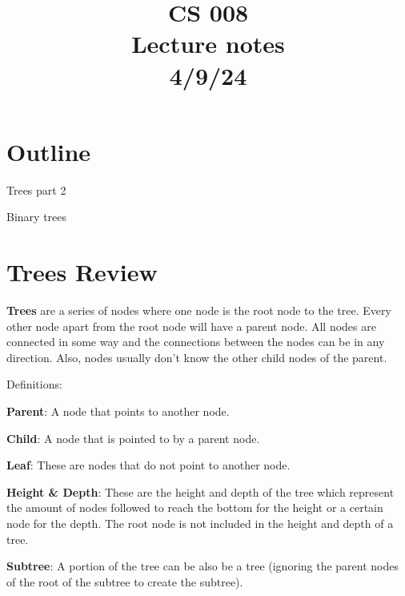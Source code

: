 \documentclass[11pt,a4paper,english]{paper}
\begin{document}
\title{CS 008 \\ Lecture notes \\ 4/9/24}
\maketitle

\section{Outline}

\begin{itemize} {

    \item Trees part 2
    \item Binary trees

}\end{itemize}

\section{Trees Review}

\textbf{Trees} are a series of nodes where one node is the root node to the tree. Every other node apart from the root node will have a parent node. All nodes are connected in some way and the connections between the nodes can be in any direction. Also, nodes usually don't know the other child nodes of the parent.

\bigskip
\begin{bluebox}{Definitions:}{

  \begin{itemize} {

      \item \textbf{Parent}: A node that points to another node.
      \item \textbf{Child}: A node that is pointed to by a parent node.
      \item \textbf{Leaf}: These are nodes that do not point to another node.
      \item \textbf{Height \& Depth}: These are the height and depth of the tree which represent the amount of nodes followed to reach the bottom for the height or a certain node for the depth. The root node is not included in the height and depth of a tree.
      \item \textbf{Subtree}: A portion of the tree can be also be a tree (ignoring the parent nodes of the root of the subtree to create the subtree).

  }\end{itemize}

}\end{bluebox}
\end{document}
